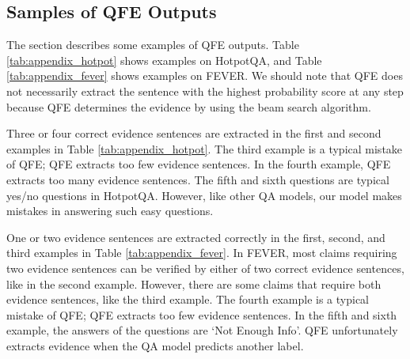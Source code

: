 \documentclass[11pt,a4paper]{article}
\theoremstyle{definition}
\begin{document}
    \subsection{Samples of QFE Outputs \label{sec:sample}}
    The section describes some examples of QFE outputs. Table \ref{tab:appendix_hotpot} shows examples on HotpotQA, and Table \ref{tab:appendix_fever} shows examples on FEVER. We should note that QFE does not necessarily extract the sentence with the highest probability score at any step because QFE determines the evidence by using the beam search algorithm.
    
    Three or four correct evidence sentences are extracted in the first and second examples in Table \ref{tab:appendix_hotpot}. The third example is a typical mistake of QFE; QFE extracts too few evidence sentences. In the fourth example, QFE extracts too many evidence sentences. The fifth and sixth questions are typical yes/no questions in HotpotQA. However, like other QA models, our model makes mistakes in answering such easy questions.
    
    One or two evidence sentences are extracted correctly in the first, second, and third examples in Table \ref{tab:appendix_fever}. In FEVER, most claims requiring two evidence sentences can be verified by either of two correct evidence sentences, like in the second example. However, there are some claims that require both evidence sentences, like the third example. The fourth example is a typical mistake of QFE; QFE extracts too few evidence sentences. In the fifth and sixth example, the answers of the questions are `Not Enough Info'. QFE unfortunately extracts evidence when the QA model predicts another label. 

	
	\begin{table}[t]
	\begin{center}
\caption{Hyper Parameters.}\label{tab:hypara}
	\end{center}
	\end{table}
	
\end{document}
